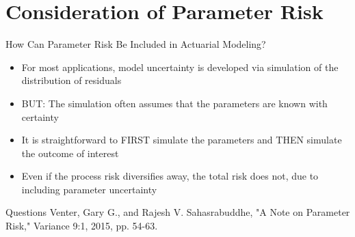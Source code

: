 \documentclass[10pt, xcolor=x11names, compress, handout]{beamer}
\begin{document}
\section{Consideration of Parameter Risk}
\begin{frame}{How Can Parameter Risk Be Included in Actuarial Modeling?}
	\begin{itemize}
		\item<1-> For most applications, model uncertainty is developed via simulation of the distribution of residuals
		\item<2-> BUT: The simulation often assumes that the parameters are known with certainty
		\item<3-> It is straightforward to FIRST simulate the parameters and THEN simulate the outcome of interest
		\item<3-> Even if the process risk diversifies away, the total risk does not, due to including parameter uncertainty
	\end{itemize}
\end{frame}

\begin{frame}{Questions}
	Venter, Gary G., and Rajesh V. Sahasrabuddhe, "A Note on Parameter Risk," Variance 9:1, 2015, pp. 54-63.
\end{frame}
\end{document}
